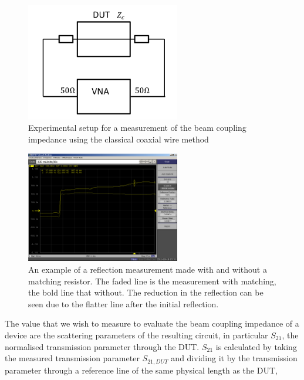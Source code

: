 \documentclass[12pt,a4paper,twopage,openright]{article}
\begin{document}
\begin{figure}
\begin{center}
\includegraphics[width=0.6\textwidth]{figures/wire_meas_single_wire.pdf}
\end{center}
\caption{Experimental setup for a measurement of the beam coupling impedance using the classical coaxial wire method}
\label{fig:classic-coax}
\end{figure} 

\begin{figure}
\begin{center}
\includegraphics[width=0.6\textwidth]{figures/coax-matching-no-matching.png}
\end{center}
\caption{An example of a reflection measurement made with and without a matching resistor. The faded line is the measurement with matching, the bold line that without. The reduction in the reflection can be seen due to the flatter line after the initial reflection.}
\label{fig:matching-plot}
\end{figure}

The value that we wish to measure to evaluate the beam coupling impedance of a device are the scattering parameters of the resulting circuit, in particular $S_{21}$, the normalised transmission parameter through the DUT. $S_{21}$ is calculated by taking the measured transmission parameter $S_{21,DUT}$ and dividing it by the transmission parameter through a reference line of the same physical length as the DUT,
\end{document}
